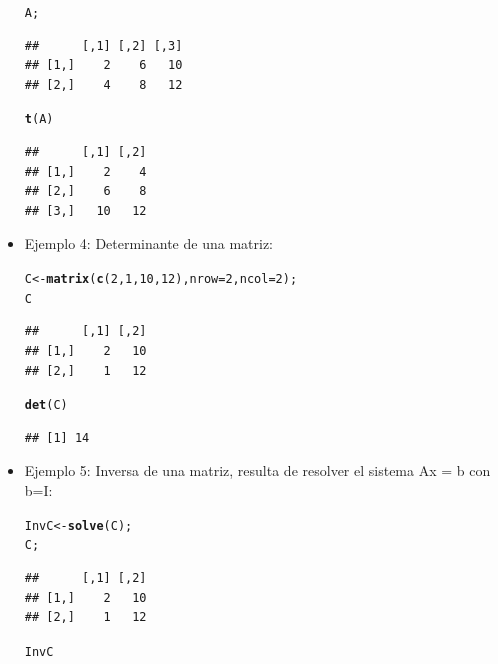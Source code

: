 \documentclass[12pt,letterpaper]{article}\usepackage[]{graphicx}\usepackage[]{color}
\makeatletter
\newcommand{\hlnum}[1]{\textcolor[rgb]{0.686,0.059,0.569}{#1}}%
\newcommand{\hlstd}[1]{\textcolor[rgb]{0.345,0.345,0.345}{#1}}%
\newcommand{\hlkwb}[1]{\textcolor[rgb]{0.69,0.353,0.396}{#1}}%
\newcommand{\hlkwc}[1]{\textcolor[rgb]{0.333,0.667,0.333}{#1}}%
\newcommand{\hlkwd}[1]{\textcolor[rgb]{0.737,0.353,0.396}{\textbf{#1}}}%
\newenvironment{kframe}{%
 \def\at@end@of@kframe{}%
 \ifinner\ifhmode%
  \def\at@end@of@kframe{\end{minipage}}%
  \begin{minipage}{\columnwidth}%
 \fi\fi%
 \def\FrameCommand##1{\hskip\@totalleftmargin \hskip-\fboxsep
 \colorbox{shadecolor}{##1}\hskip-\fboxsep
     \hskip-\linewidth \hskip-\@totalleftmargin \hskip\columnwidth}%
 \MakeFramed {\advance\hsize-\width
   \@totalleftmargin\z@ \linewidth\hsize
   \@setminipage}}%
 {\par\unskip\endMakeFramed%
 \at@end@of@kframe}
\newenvironment{knitrout}{}{} %
\makeatother
\begin{document}
\begin{itemize}
\begin{knitrout}
\begin{kframe}
\begin{alltt}
\hlstd{A;}
\end{alltt}
\begin{verbatim}
##      [,1] [,2] [,3]
## [1,]    2    6   10
## [2,]    4    8   12
\end{verbatim}
\begin{alltt}
\hlkwd{t}\hlstd{(A)}
\end{alltt}
\begin{verbatim}
##      [,1] [,2]
## [1,]    2    4
## [2,]    6    8
## [3,]   10   12
\end{verbatim}
\end{kframe}
\end{knitrout}
\item Ejemplo 4: Determinante de una matriz:
\begin{knitrout}
\color{fgcolor}\begin{kframe}
\begin{alltt}
\hlstd{C} \hlkwb{<-} \hlkwd{matrix}\hlstd{(}\hlkwd{c}\hlstd{(}\hlnum{2}\hlstd{,} \hlnum{1}\hlstd{,} \hlnum{10}\hlstd{,} \hlnum{12}\hlstd{),} \hlkwc{nrow}\hlstd{=}\hlnum{2}\hlstd{,} \hlkwc{ncol}\hlstd{=}\hlnum{2}\hlstd{);}
\hlstd{C}
\end{alltt}
\begin{verbatim}
##      [,1] [,2]
## [1,]    2   10
## [2,]    1   12
\end{verbatim}
\begin{alltt}
\hlkwd{det}\hlstd{(C)}
\end{alltt}
\begin{verbatim}
## [1] 14
\end{verbatim}
\end{kframe}
\end{knitrout}
\item Ejemplo 5: Inversa de una matriz, resulta de resolver el sistema Ax = b con b=I:
\begin{knitrout}
\color{fgcolor}\begin{kframe}
\begin{alltt}
\hlstd{InvC} \hlkwb{<-} \hlkwd{solve}\hlstd{(C) ;}
\hlstd{C;}
\end{alltt}
\begin{verbatim}
##      [,1] [,2]
## [1,]    2   10
## [2,]    1   12
\end{verbatim}
\begin{alltt}
\hlstd{InvC}
\end{alltt}
\begin{verbatim}

\end{verbatim}
\end{kframe}
\end{knitrout}
\end{itemize}
\end{document}
